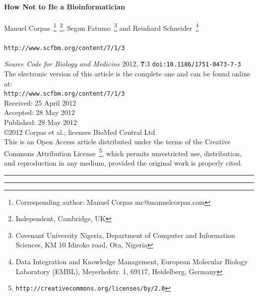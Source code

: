 \documentclass[11pt,twoside,a4paper]{article}
\begin{document}
\setlength\parindent{0pt}

~\\

\begin{center}
	\textbf{\LARGE How Not to Be a Bioinformatician}~\\
	~\\
	Manuel Corpas~\footnote{Corresponding author: Manuel Corpas mc@manuelcorpas.com}~\footnote{Independent, Cambridge, UK}, Segun Fatumo~\footnote{Covenant University Nigeria, Department of Computer and Information Sciences, KM 10 Idiroko road, Ota, Nigeria} and Reinhard Schneider~\footnote{Data Integration and Knowledge Management, European Molecular Biology Laboratory (EMBL), Meyerhofstr. 1, 69117, Heidelberg, Germany}~\\
	~\\
	\texttt{http://www.scfbm.org/content/7/1/3}
\end{center}	

\emph{Source Code for Biology and Medicine} 2012, \textbf{7}:3 \texttt{doi:10.1186/1751-0473-7-3}~\\

The electronic version of this article is the complete one and can be found online at: ~\\
\texttt{http://www.scfbm.org/content/7/1/3}~\\

Received:	25 April 2012~\\
Accepted:	28 May 2012~\\
Published:	28 May 2012~\\

\copyright 2012 Corpas et al.; licensee BioMed Central Ltd.~\\

This is an Open Access article distributed under the terms of the Creative Commons Attribution License~\footnote{\texttt{http://creativecommons.org/licenses/by/2.0}}, which permits unrestricted use, distribution, and reproduction in any medium, provided the original work is properly cited.~\\

\begin{center} \rule{10cm}{0.01cm} \end{center}

\tableofcontents

\begin{center} \rule{10cm}{0.01cm} \end{center}
\end{document}
